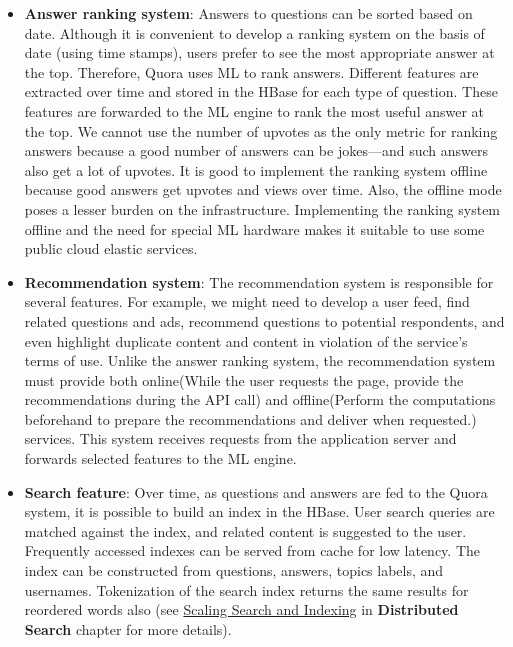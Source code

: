 \begin{itemize}
\item
\protect{}\label{hT1eVPS7p--apFaf-eXF0}
\textbf{Answer ranking system}: Answers to questions can be sorted based on date. Although it is convenient to develop a ranking system on the basis of date (using time stamps), users prefer to see the most appropriate answer at the top. Therefore, Quora uses ML to rank answers. Different features are extracted over time and stored in the HBase for each type of question. These features are forwarded to the ML engine to rank the most useful answer at the top. We cannot use the number of upvotes as the only metric for ranking answers because a good number of answers can be jokes---and such answers also get a lot of upvotes. It is good to implement the ranking system offline because good answers get upvotes and views over time. Also, the offline mode poses a lesser burden on the infrastructure. Implementing the ranking system offline and the need for special ML hardware makes it suitable to use some public cloud elastic services.
\item
\protect{}\label{5mfeNSFDhA-vJDXLQPBz-}
\textbf{Recommendation system}: The recommendation system is responsible for several features. For example, we might need to develop a user feed, find related questions and ads, recommend questions to potential respondents, and even highlight duplicate content and content in violation of the service's terms of use. Unlike the answer ranking system, the recommendation system must provide both online(While the user requests the page, provide the recommendations during the API call) and offline(Perform the computations beforehand to prepare the recommendations and deliver when requested.) services. This system receives requests from the application server and forwards selected features to the ML engine.
\item
\protect{}\label{lE9z1JtsDjY_EmJziayy0}
\textbf{Search feature}: Over time, as questions and answers are fed to the Quora system, it is possible to build an index in the HBase. User search queries are matched against the index, and related content is suggested to the user. Frequently accessed indexes can be served from cache for low latency. The index can be constructed from questions, answers, topics labels, and usernames. Tokenization of the search index returns the same results for reordered words also (see \href{https://www.educative.io/courses/grokking-the-system-design-interview/scaling-search-and-indexing}{Scaling Search and Indexing} in \textbf{Distributed Search} chapter for more details).
\end{itemize}

